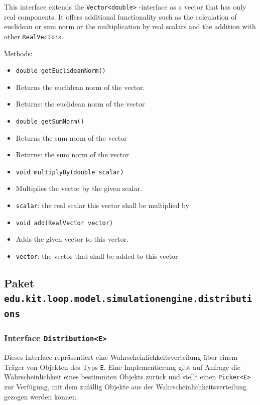\documentclass[parskip=full,11pt]{scrartcl}
\begin{document}
This interface extends the \texttt{Vector<double>}
-interface as a vector that has only real components. It offers additional functionality such as the calculation of euclidean or sum norm or the multiplication by real scalars and the addition with other \texttt{RealVector}s.

Methods:
\begin{itemize}\itemsep -10pt
\item \texttt{double getEuclideanNorm()}
\item[] Returns the euclidean norm of the vector.
\item[] Returns: the euclidean norm of the vector

\item \texttt{double getSumNorm()}
\item[] Returns the sum norm of the vector
\item[] Returns: the sum norm of the vector

\item \texttt{void multiplyBy(double scalar)}
\item[] Multiplies the vector by the given scalar.
\item[] \texttt{scalar}: the real scalar this vector shall be multiplied by

\item \texttt{void add(RealVector vector)}
\item[] Adds the given vector to this vector.
\item[] \texttt{vector}: the vector that shall be added to this vector
\end{itemize}

\subsection{Paket \texttt{edu.kit.loop.model.simulationengine.distributions}}

\subsubsection{Interface \texttt{Distribution<E>}}
Dieses Interface repräsentiert eine Wahrscheinlichkeitsverteilung über einem Träger von Objekten des Typs \texttt{E}. Eine Implementierung gibt auf Anfrage die Wahrscheinlichkeit eines bestimmten Objekts zurück und stellt einen \texttt{Picker<E>} zur Verfügung, mit dem zufällig Objekte aus der Wahrscheinlichkeitsverteilung gezogen werden können.
\end{document}

